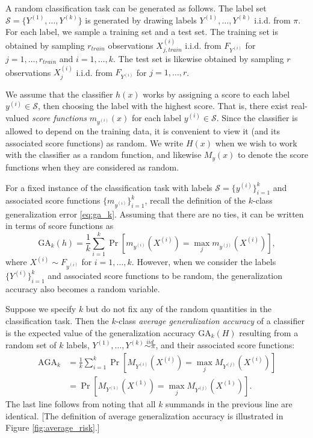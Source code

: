 \documentclass[12pt]{article}
\begin{document}
A random classification task can be generated as follows.  The
label set $\mathcal{S} = \{Y^{(1)},\hdots, Y^{(k)}\}$ is generated by
drawing labels $Y^{(1)},\hdots, Y^{(k)}$ i.i.d. from $\pi$.  
For each label, we sample a training set and a
test set.  The training set is obtained by sampling $r_{train}$ observations
$X_{j, train}^{(i)}$ i.i.d. from $F_{Y^{(i)}}$ for $j = 1,\hdots,
r_{train}$ and $i = 1,\hdots, k$.  The test set is likewise obtained by sampling $r$
observations $X_j^{(i)}$ i.i.d. from $F_{Y^{(i)}}$ for $j = 1,\hdots,
r$.  

We assume that the classifier $h(x)$ works by assigning a score to each label $y^{(i)} \in \mathcal{S}$, then choosing the label with the highest score.  That is, there exist real-valued \emph{score functions} $m_{y^{(i)}}(x)$ for each label $y^{(i)} \in \mathcal{S}$.
Since the classifier is allowed to depend on the training data, it is convenient to view it (and its associated score functions) as random.  We write $H(x)$ when we wish to work with the classifier as a random function, and likewise $M_y(x)$ to denote the score functions when they are considered as random.

For a fixed instance of the classification task with labels $\mathcal{S} = \{y^{(i)}\}_{i=1}^k$ and associated score functions $\{m_{y^{(i)}}\}_{i=1}^k$, recall the definition of the $k$-class generalization error \eqref{eq:ga_k}.  Assuming that there are no ties, it can be written in terms of score functions as
\[
\text{GA}_k(h) = \frac{1}{k} \sum_{i=1}^k  \Pr[m_{y^{(i)}}(X^{(i)}) = \max_j
m_{y^{(j)}}(X^{(i)})],
\]
where $X^{(i)} \sim F_{y^{(i)}}$ for $i =1,\hdots, k$.
However, when we consider the labels $\{Y^{(i)}\}_{i=1}^k$ and associated score functions to be random, the generalization accuracy also becomes a random variable.

Suppose we specify $k$ but do not fix any of the random quantities in the
classification task.  Then the $k$-class \emph{average generalization accuracy} of
a classifier is the expected value of the generalization accuracy $\text{GA}_k(H)$ resulting from a random set of $k$ labels, $Y^{(1)}, \hdots, Y^{(k)} \stackrel{iid}{\sim \pi}$, and their associated score functions:
\begin{align*}
\text{AGA}_k &= \frac{1}{k} \sum_{i=1}^k \Pr[M_{Y^{(i)}}(X^{(i)}) = \max_j
M_{Y^{(j)}}(X^{(i)})]
\\&= \Pr[M_{Y^{(1)}}(X^{(1)}) = \max_j M_{Y^{(j)}}(X^{(1)})].
\end{align*}
The last line follows from noting that all $k$ summands in the previous line are identical.
[The definition of average generalization accuracy is illustrated in Figure \ref{fig:average_risk}.]
\end{document}
